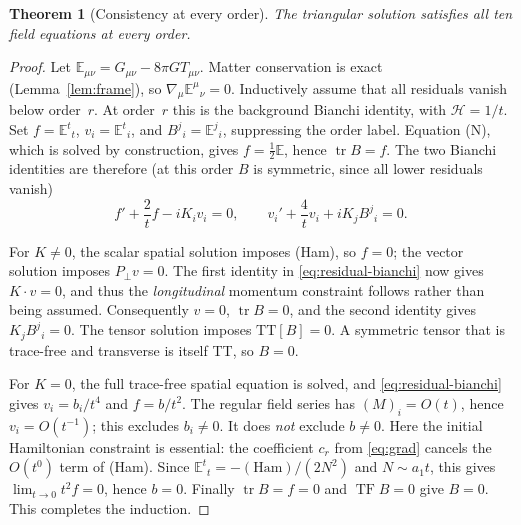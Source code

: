 \documentclass[11pt]{article}
\newtheorem{theorem}{Theorem}
\theoremstyle{definition}
\theoremstyle{remark}
\newcommand{\TF}{\operatorname{TF}}
\begin{document}
\begin{theorem}[Consistency at every order]\label{thm:consistency}
The triangular solution satisfies all ten field equations at every order.
\end{theorem}
\begin{proof}
Let $\mathbb E_{\mu\nu}=G_{\mu\nu}-8\pi GT_{\mu\nu}$. Matter conservation is exact
(Lemma~\ref{lem:frame}), so $\nabla_\mu\mathbb E^\mu{}_\nu=0$. Inductively assume that all
residuals vanish below order~$r$. At order~$r$ this is the background Bianchi identity, with
$\mathcal H=1/t$. Set $f=\mathbb E^t{}_t$, $v_i=\mathbb E^t{}_i$, and
$B^j{}_i=\mathbb E^j{}_i$, suppressing the order label. Equation (N), which is solved by
construction, gives $f=\frac12\mathbb E$, hence $\operatorname{tr}B=f$. The two Bianchi
identities are therefore (at this order $B$ is symmetric, since all lower residuals vanish)
\begin{equation}\label{eq:residual-bianchi}
f'+\frac2t f-iK_iv_i=0,\qquad
v_i'+\frac4t v_i+iK_jB^j{}_i=0.
\end{equation}

For $K\neq0$, the scalar spatial solution imposes (Ham), so $f=0$; the vector solution
imposes $P_\perp v=0$. The first identity in \eqref{eq:residual-bianchi} now gives
$K\cdot v=0$, and thus the \emph{longitudinal} momentum constraint follows rather than being
assumed. Consequently $v=0$, $\operatorname{tr}B=0$, and the second identity gives
$K_jB^j{}_i=0$. The tensor solution imposes $\mathrm{TT}[B]=0$. A symmetric tensor that is
trace-free and transverse is itself TT, so $B=0$.

For $K=0$, the full trace-free spatial equation is solved, and
\eqref{eq:residual-bianchi} gives $v_i=b_i/t^4$ and $f=b/t^2$. The regular field series has
$(M)_i=O(t)$, hence $v_i=O(t^{-1})$; this excludes $b_i\neq0$. It does \emph{not} exclude
$b\neq0$. Here the initial Hamiltonian constraint is essential: the coefficient $c_r$ from
\eqref{eq:grad} cancels the $O(t^0)$ term of (Ham). Since
$\mathbb E^t{}_t=-(\mathrm{Ham})/(2N^2)$ and $N\sim a_1t$, this gives
$\lim_{t\to0}t^2f=0$, hence $b=0$. Finally $\operatorname{tr}B=f=0$ and $\TF B=0$ give
$B=0$. This completes the induction.
\end{proof}
\end{document}
